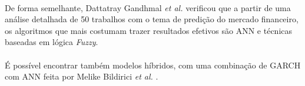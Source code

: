 \paragraph{} De forma semelhante, Dattatray Gandhmal \textit{et al.} \cite{gandhmal2019systematic} verificou que a partir de uma análise detalhada de 50 trabalhos com o tema de predição do mercado financeiro, os algoritmos que mais costumam trazer resultados efetivos são ANN e técnicas baseadas em lógica \textit{Fuzzy}.

\paragraph{} É possível encontrar também modelos híbridos, com uma combinação de GARCH com ANN feita por Melike Bildirici \textit{et al.} \cite{bildirici2009improving}.